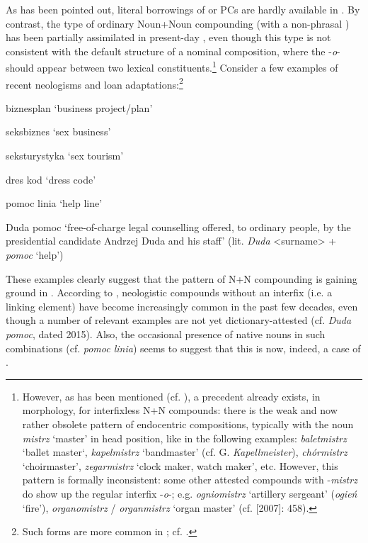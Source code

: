 \documentclass[output=paper]{LSP/langsci}
\begin{document}
{As has been pointed out, literal borrowings of  or  PCs are hardly available in . By contrast, the  type of ordinary Noun+Noun compounding (with a non-phrasal ) has been partially assimilated in present-day , even though this type is not consistent with the default structure of a  nominal composition, where the  -}{\textit{o}}{- should appear between two lexical constituents.}\footnote{{However, as has been mentioned (cf. ), a precedent already exists, in  morphology, for interfixless N+N compounds: there is the weak and now rather obsolete pattern of endocentric compositions, typically with the noun} {\textit{mistrz}} {‘master’ in head position, like in the following examples:} {\textit{baletmistrz}} {‘ballet master‘,} {\textit{kapelmistrz}} {‘bandmaster’ (cf. G.} {\textit{Kapellmeister}}), {\textit{chórmistrz}} {‘choirmaster’,} {\textit{zegarmistrz}} {‘clock maker, watch maker’, etc. However, this pattern is formally inconsistent: some other attested compounds with -}{\textit{mistrz}} {do show up the regular interfix -}{\textit{o}}{-; e.g.} {\textit{ogniomistrz}} {‘artillery sergeant’ (}{\textit{ogień}} {‘fire’),} {\textit{organomistrz}} {/} {\textit{organmistrz}} {‘organ master’ (cf. \citealt{Kurzowa1976} [2007]: 458).}} {Consider a few examples of recent neologisms and loan adaptations:}\footnote{{Such forms are more common in ; cf. \citet{Ohnheiser2015}.}}



\ea%
    \label{ex:szymanek:13} 
  biznesplan ‘business project/plan’

  seksbiznes ‘sex business’

  seksturystyka ‘sex tourism’

  dres kod ‘dress code’

  pomoc linia ‘help line’


{Duda pomoc ‘free-of-charge legal counselling offered, to ordinary people, by the presidential candidate Andrzej Duda and his staff’ (lit.} {\textit{Duda}} {<surname> +} {\textit{pomoc}} {‘help’)}
\z

{These examples clearly suggest that the  pattern of N+N compounding is gaining ground in . According to \citet[93]{Jadacka2001},  neologistic compounds without an interfix (i.e. a linking element) have become increasingly common in the past few decades, even though a number of relevant examples are not yet dictionary-attested (cf.} {\textit{Duda pomoc}}{, dated 2015). Also, the occasional presence of native nouns in such combinations (cf.} {\textit{pomoc linia}}{) seems to suggest that this is now, indeed, a case of .}
\end{document}
